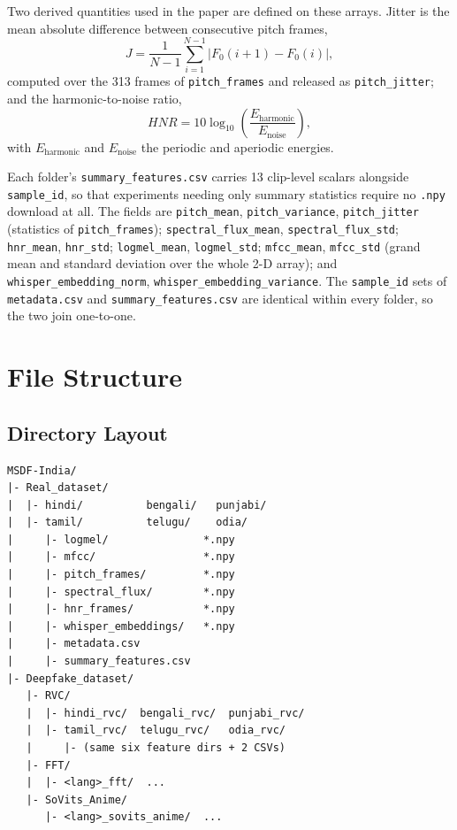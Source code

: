 \documentclass[conference]{IEEEtran}
\begin{document}
Two derived quantities used in the paper are defined on these arrays. Jitter is the mean
absolute difference between consecutive pitch frames,
\begin{equation}
J = \frac{1}{N-1}\sum_{i=1}^{N-1}\left|F_0(i+1) - F_0(i)\right|,
\end{equation}
computed over the 313 frames of \texttt{pitch\_frames} and released as
\texttt{pitch\_jitter}; and the harmonic-to-noise ratio,
\begin{equation}
HNR = 10\log_{10}\!\left(\frac{E_{\text{harmonic}}}{E_{\text{noise}}}\right),
\end{equation}
with $E_{\text{harmonic}}$ and $E_{\text{noise}}$ the periodic and aperiodic energies.

Each folder's \texttt{summary\_features.csv} carries 13 clip-level scalars alongside
\texttt{sample\_id}, so that experiments needing only summary statistics require no
\texttt{.npy} download at all. The fields are \texttt{pitch\_mean},
\texttt{pitch\_variance}, \texttt{pitch\_jitter} (statistics of
\texttt{pitch\_frames}); \texttt{spectral\_flux\_mean}, \texttt{spectral\_flux\_std};
\texttt{hnr\_mean}, \texttt{hnr\_std}; \texttt{logmel\_mean}, \texttt{logmel\_std};
\texttt{mfcc\_mean}, \texttt{mfcc\_std} (grand mean and standard deviation over the whole
2-D array); and \texttt{whisper\_embedding\_norm},
\texttt{whisper\_embedding\_variance}. The \texttt{sample\_id} sets of
\texttt{metadata.csv} and \texttt{summary\_features.csv} are identical within every
folder, so the two join one-to-one.

\section{File Structure}

\subsection{Directory Layout}
\begin{scriptsize}
\begin{verbatim}
MSDF-India/
|- Real_dataset/
|  |- hindi/          bengali/   punjabi/
|  |- tamil/          telugu/    odia/
|     |- logmel/               *.npy
|     |- mfcc/                 *.npy
|     |- pitch_frames/         *.npy
|     |- spectral_flux/        *.npy
|     |- hnr_frames/           *.npy
|     |- whisper_embeddings/   *.npy
|     |- metadata.csv
|     |- summary_features.csv
|- Deepfake_dataset/
   |- RVC/
   |  |- hindi_rvc/  bengali_rvc/  punjabi_rvc/
   |  |- tamil_rvc/  telugu_rvc/   odia_rvc/
   |     |- (same six feature dirs + 2 CSVs)
   |- FFT/
   |  |- <lang>_fft/  ...
   |- SoVits_Anime/
      |- <lang>_sovits_anime/  ...
\end{verbatim}
\end{scriptsize}
\end{document}
